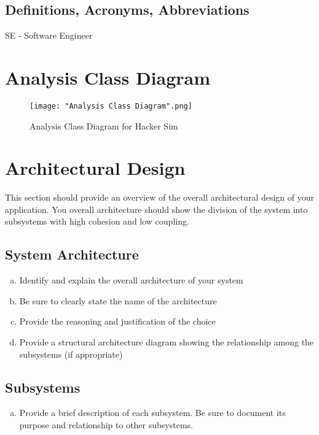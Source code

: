 \documentclass[]{article}
\begin{document}
\subsection{Definitions, Acronyms, Abbreviations}
\label{sub:definitions_acronyms_abbreviations}
SE - Software Engineer

\section{Analysis Class Diagram}
\label{sec:analysis_class_diagram}
\begin{figure}[H]
    \centering
    \texttt{[image: "Analysis Class Diagram".png]}
    \caption{Analysis Class Diagram for Hacker Sim}
\end{figure}


\section{Architectural Design}
\label{sec:architectural_design}
This section should provide an overview of the overall architectural design of your application. You overall architecture should show the division of the system into subsystems with high cohesion and low coupling.

\subsection{System Architecture}
\label{sub:system_architecture}
\begin{enumerate}[a)]
	\item Identify and explain the overall architecture of your system
	\item Be sure to clearly state the name of the architecture
	\item Provide the reasoning and justification of the choice
	\item Provide a structural architecture diagram showing the relationship among the subsystems (if appropriate)
\end{enumerate}

\subsection{Subsystems}
\label{sub:subsystems}
\begin{enumerate}[a)]
	\item Provide a brief description of each subsystem. Be sure to document its purpose and relationship to other subsystems.
\end{enumerate}
\end{document}
